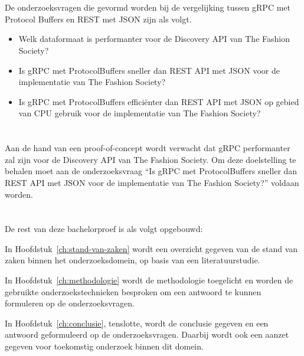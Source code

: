 \section{}
\label{sec:onderzoeksvraag}

De onderzoeksvragen die gevormd worden bij de vergelijking tussen gRPC met Protocol Buffers en REST met JSON zijn als volgt.
\begin{itemize}
    \item Welk dataformaat is performanter voor de Discovery API van The Fashion Society?
    \item Is gRPC met ProtocolBuffers sneller dan REST API met JSON voor de implementatie van The Fashion Society?
    \item Is gRPC met ProtocolBuffers efficiënter dan REST API met JSON op gebied van CPU gebruik voor de implementatie van The Fashion Society?
\end{itemize}

\section{}
\label{sec:onderzoeksdoelstelling}

Aan de hand van een proof-of-concept wordt verwacht dat gRPC performanter zal zijn voor de Discovery API van The Fashion Society. Om deze doelstelling te behalen moet aan de onderzoeksvraag “Is gRPC met ProtocolBuffers sneller dan REST API met JSON voor de implementatie van The Fashion Society?” voldaan worden.

\section{}
\label{sec:opzet-bachelorproef}


De rest van deze bachelorproef is als volgt opgebouwd:

In Hoofdstuk~\ref{ch:stand-van-zaken} wordt een overzicht gegeven van de stand van zaken binnen het onderzoeksdomein, op basis van een literatuurstudie.

In Hoofdstuk~\ref{ch:methodologie} wordt de methodologie toegelicht en worden de gebruikte onderzoekstechnieken besproken om een antwoord te kunnen formuleren op de onderzoeksvragen.


In Hoofdstuk~\ref{ch:conclusie}, tenslotte, wordt de conclusie gegeven en een antwoord geformuleerd op de onderzoeksvragen. Daarbij wordt ook een aanzet gegeven voor toekomstig onderzoek binnen dit domein.